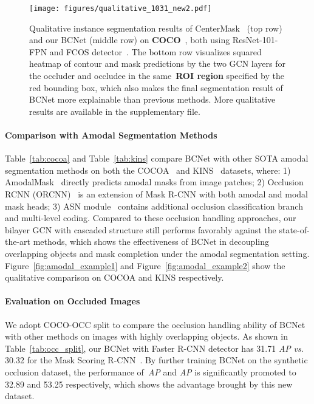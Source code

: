 \begin{figure*}[!h]
	\centering
\texttt{[image: figures/qualitative\_1031\_new2.pdf]}
\vspace{-0.1in}
	\caption{Qualitative instance segmentation results of CenterMask~\cite{lee2019centermask} (top row) and our BCNet (middle row) on \textbf{COCO}~\cite{lin2014microsoft}, both using ResNet-101-FPN and FCOS detector~\cite{tian2019fcos}. The bottom row visualizes squared heatmap of contour and mask predictions by the two GCN layers for the occluder and occludee in the same~\textbf{ROI region} specified by the {\color{red} red} bounding box, which also makes the final segmentation result of BCNet more explainable than previous methods. More qualitative results are available in the supplementary file.}
	\label{fig:qualitative}
	\vspace{-0.1in}
\end{figure*}

\paragraph{Comparison with Amodal Segmentation Methods}
Table~\ref{tab:cocoa} and Table~\ref{tab:kins} compare BCNet with other SOTA amodal segmentation methods on both the COCOA~\cite{zhu2017semantic} and KINS~\cite{qi2019amodal} datasets, where: 1) AmodalMask~\cite{zhu2017semantic} directly predicts amodal masks from image patches; 2) Occlusion RCNN (ORCNN)~\cite{follmann2019learning} is an extension of Mask R-CNN with both amodal and modal mask heads; 3) ASN module~\cite{qi2019amodal} contains additional occlusion classification branch and multi-level coding. 
Compared to these occlusion handling approaches, our bilayer GCN with cascaded structure still performs favorably against the state-of-the-art methods, which shows the effectiveness of BCNet in decoupling overlapping objects and mask completion under the amodal segmentation setting.
Figure~\ref{fig:amodal_example1} and Figure~\ref{fig:amodal_example2} show the qualitative comparison on COCOA and KINS respectively.
\vspace{-0.1in}

\paragraph{Evaluation on Occluded Images}
We adopt COCO-OCC split to compare the occlusion handling ability of BCNet with other methods on images with highly overlapping objects. As shown in Table~\ref{tab:occ_split}, our BCNet with Faster R-CNN detector has 31.71 \textit{AP} \textit{vs.} 30.32 for the Mask Scoring R-CNN~\cite{huang2019mask}. By further training BCNet on the synthetic occlusion dataset, the performance of~\textit{AP} and \textit{AP} is significantly promoted to 32.89 and 53.25 respectively, which shows the advantage brought by this new dataset.
\vspace{-0.1in}

